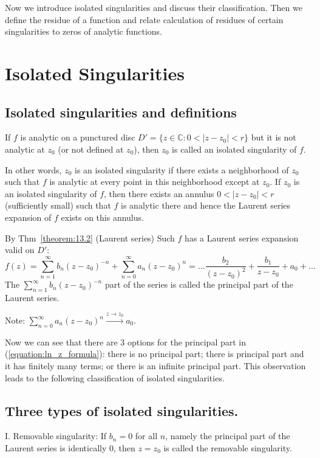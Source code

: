 Now we introduce isolated singularities and discuss their classification. Then we define the residue of a function and relate calculation of residues of certain singularities to zeros of analytic functions.
\section{Isolated Singularities}

\subsection{Isolated singularities and definitions}

\begin{definition}\label{definition:16.1} 
    If $f$ is analytic on a punctured disc $D' = \{z \in \mathbb{C}: 0 < |z - z_0| < r\}$ but it is not analytic at $z_0$ (or not defined at $z_0$), then $z_0$ is called an isolated singularity of $f$.
\end{definition}

In other words, $z_0$ is an isolated singularity if there exists a neighborhood of $z_0$ such that $f$ is analytic at every point in this neighborhood except at $z_0$. 
If $z_0$ is an isolated singularity of $f$, then there exists an annulus $0 < |z - z_0| < r$ (sufficiently small) such that $f$ is analytic there 
and hence the Laurent series expansion of $f$ exists on this annulus.

By Thm~\ref{theorem:13.2} (Laurent series) Such $f$ has a Laurent series expansion valid on $D'$:
\[  f(z) = \sum_{n=1}^{\infty} b_n (z - z_0)^{-n} + \sum_{n=0}^{\infty} a_n (z - z_0)^n = \dots \frac{b_2}{(z-z_0)^2} + \frac{b_1}{z-z_0} + a_0 + \dots \]
The $\sum_{n=1}^{\infty} b_n (z - z_0)^{-n}$ part of the series is called the principal part of the Laurent series.

Note: $\sum_{n=0}^{\infty} a_n (z - z_0)^n \xrightarrow{z \to z_0} a_0$.

Now we can see that there are 3 options for the principal part in (\ref{equation:ln_z_formula}): there is no principal part; there is principal part and it has finitely many terms; or there is an infinite principal part. 
This observation leads to the following classification of isolated singularities.

\subsection{Three types of isolated singularities.}
I. Removable singularity: If $b_n = 0$ for all $n$, namely the principal part of the Laurent series is identically 0, then $z = z_0$ is called the removable singularity.


